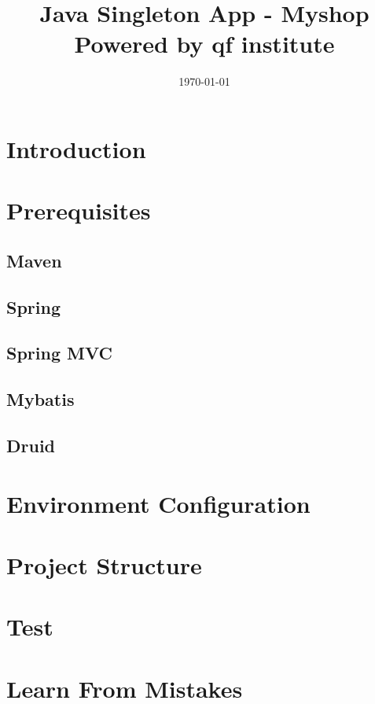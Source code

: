 \documentclass{article}
\begin{document}
	\title{Java Singleton App - Myshop \\ Powered by qf institute}
	\date \today
	
	\maketitle
	\section{Introduction}
	\section{Prerequisites}
		\subsection{Maven}
		\subsection{Spring}
		\subsection{Spring MVC}
		\subsection{Mybatis}
		\subsection{Druid}
	\section{Environment Configuration}
	\section{Project Structure}
	\section{Test}
	\section{Learn From Mistakes}
\end{document}
